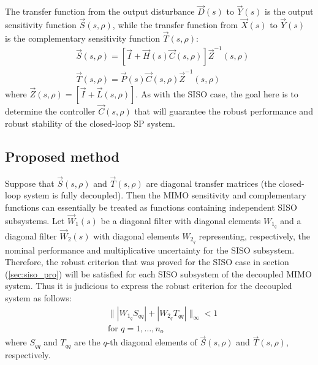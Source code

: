 \documentclass[default]{svmult}
\begin{document}

The transfer function from the output disturbance $\vec{D}(s)$ to $\vec{Y}(s)$ is the output sensitivity function $\vec{S}(s,\rho)$, while the transfer function from $\vec{X}(s)$ to $\vec{Y}(s)$ is the complementary sensitivity function $\vec{T}(s,\rho)$:
\begin{align}\label{eq:sens_mimo}
&\vec{S}(s,\rho)=[\vec{I}+\vec{H}(s)\vec{C}(s,\rho)]\vec{Z}^{-1}(s,\rho) \nonumber\\ &\vec{T}(s,\rho)=\vec{P}(s) \vec{C}(s,\rho) \vec{Z}^{-1}(s,\rho)
\end{align}
where $\vec{Z}(s,\rho)=[\vec{I}+\vec{L}(s,\rho)]$. As with the SISO case, the goal here is to determine the controller $\vec{C}(s,\rho)$ that will guarantee the robust performance and robust stability of the closed-loop SP system. 


\subsection{Proposed method}
Suppose that $\vec{S}(s,\rho)$ and $\vec{T}(s,\rho)$ are diagonal transfer matrices (the closed-loop system is fully decoupled). Then the MIMO sensitivity and complementary functions can essentially be treated as functions containing independent SISO subsystems. Let $\vec{W}_1(s)$ be a diagonal filter with diagonal elements $W_{1_{q}}$ and  a diagonal filter $\vec{W}_2(s)$ with diagonal elements $W_{2_{q}}$ representing, respectively, the nominal performance and multiplicative uncertainty for the SISO subsystem. Therefore, the robust criterion that was proved for the SISO case in section (\ref{sec:siso_pro}) will be satisfied for each SISO subsystem of the decoupled MIMO system. Thus it is judicious to express the robust criterion for the decoupled system as follows:
\begin{align} \label{eq:mimo_hinf}
&\| |W_{1_{q}}S_{qq}|+ |W_{2_{q}}T_{qq}| \|_{\infty} < 1 \nonumber\\
&\mbox{for }q=1,\ldots,n_o
\end{align}
where $S_{qq}$ and $T_{qq}$ are the $q$-th diagonal elements of $\vec{S}(s,\rho)$ and $\vec{T}(s,\rho)$, respectively. 
\end{document}
